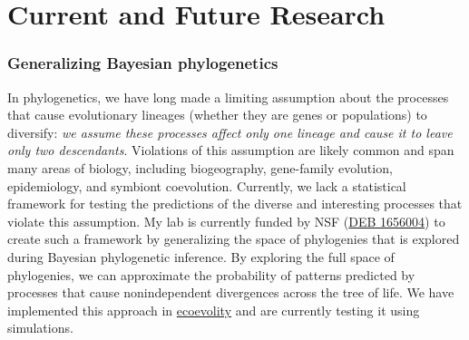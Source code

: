 
\section*{Current and Future Research}



\subsubsection*{Generalizing Bayesian phylogenetics}
In phylogenetics, we have long made a limiting assumption about the processes
that cause evolutionary lineages (whether they are genes or populations) to
diversify: \textit{we assume these processes affect only one lineage and cause
    it to leave only two descendants}.
Violations of this assumption are likely common and span many areas of biology,
including biogeography, gene-family evolution, epidemiology, and symbiont
coevolution.
Currently, we lack a statistical framework for testing the predictions of the
diverse and interesting processes that violate this assumption.
My lab is currently funded by NSF
(\href{https://www.nsf.gov/awardsearch/showAward?AWD_ID=1656004&HistoricalAwards=false}{DEB 1656004})
to create such a framework by generalizing the space of phylogenies that is
explored during Bayesian phylogenetic inference.
By exploring the full space of phylogenies, we can approximate the probability
of patterns predicted by processes that cause nonindependent divergences 
across the tree of life.
We have implemented this approach in 
\href{http://phyletica.org/ecoevolity/}{ecoevolity}
and are currently testing it using simulations.

